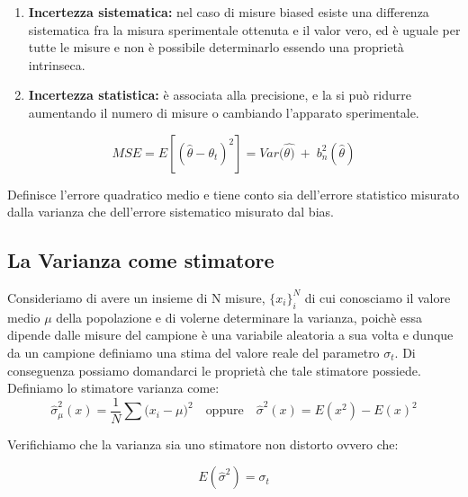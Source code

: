 \documentclass[11pt,a4paper]{book}
\begin{document}
\begin{enumerate}
	\item \textbf{Incertezza sistematica:} nel caso di misure biased esiste una differenza sistematica fra la misura sperimentale ottenuta e il valor vero, ed \`{e} uguale per tutte le misure e non \`{e} possibile determinarlo essendo una propriet\`{a} intrinseca.
	\item \textbf{Incertezza statistica:} \`{e} associata alla precisione, e la si pu\`{o} ridurre aumentando il numero di misure o cambiando l'apparato sperimentale.
\end{enumerate}
\begin{equation}
		MSE =E[(\hat{\theta} -\theta_t)^2] =Var(\hat{\theta)} \: + \; b_{n}^2(\hat{\theta}) 
\end{equation}

Definisce l'errore quadratico medio e tiene conto sia dell'errore statistico misurato dalla varianza che dell'errore sistematico misurato dal bias.
\subsection{La Varianza come stimatore}

Consideriamo di avere un insieme di N misure, $\{x_{i}\}_{i}^N$ di cui conosciamo il valore medio $\mu$ della popolazione e di volerne determinare la varianza, poich\`{e} essa dipende dalle misure del campione \`{e} una variabile aleatoria a sua volta e dunque da un campione definiamo una stima del valore reale del parametro $\sigma_{t}$. Di conseguenza possiamo domandarci le propriet\`{a} che tale stimatore possiede.
	\newline
Definiamo lo stimatore varianza come:		
\begin{equation*}
		 \hat{\sigma}_{\mu}^2(x) = \frac{1}{N} \sum{(x_{i}-\mu})^2 \quad \text{oppure} \quad   \hat{\sigma}^2(x) = E(x^2) - E(x)^2
\end{equation*}

\noindent Verifichiamo che la varianza sia uno stimatore non distorto ovvero che:

\begin{equation*}
		E(\hat{\sigma}^2) = \sigma_{t}	
\end{equation*}
\end{document}
